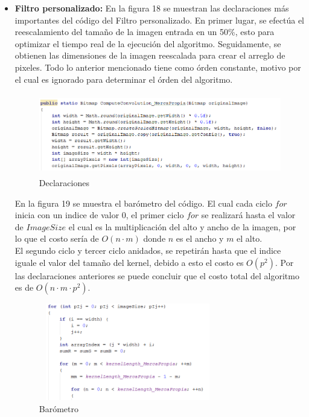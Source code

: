 \documentclass[journal]{IEEEtran}
\begin{document}
\newpage
	\begin{itemize}
		
		\item{\bf Filtro personalizado:} En la figura 18 se muestran las declaraciones más importantes del código del Filtro personalizado. En primer lugar, se efectúa el reescalamiento del tamaño de la imagen entrada en un 50\%, esto para optimizar el tiempo real de la ejecución del algoritmo. Seguidamente, se obtienen las dimensiones de la imagen reescalada para crear el arreglo de pixeles. Todo lo anterior mencionado tiene como órden constante, motivo por el cual es ignorado para determinar el órden del algoritmo.
	
		
		\begin{figure}[h]
			\centering
			\includegraphics[height= 100pt, width=300pt]{mp1.png}
			\caption{Declaraciones}
		\end{figure}
	
		En la figura 19 se muestra el barómetro del código. El cual cada ciclo $for$ inicia con un indice de valor 0, el primer ciclo $for$ se realizará hasta el valor de $ImageSize$ el cual es la multiplicación del alto y ancho de la imagen, por lo que el costo sería de $O(n \cdot m)$ donde $n$ es el ancho y $m$ el alto. \\ 
		El segundo ciclo y tercer ciclo anidados, se repetirán hasta que el indice iguale el valor del tamaño del kernel, debido a esto el costo es $O(p^2)$. Por las declaraciones anteriores se puede concluir que el costo total del algoritmo es de $O(n \cdot m \cdot p^2)$.
	
		\begin{figure}[h]
			\centering
			\includegraphics[height= 120pt, width=220pt]{mp2.png}
			\caption{Barómetro}
		\end{figure}
	
	
	\end{itemize}
	
\end{document}
